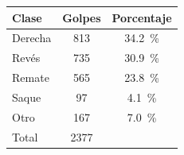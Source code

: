 \begin{tabular}{lcc}
\toprule
\textbf{Clase} & \textbf{Golpes} & \textbf{Porcentaje} \\
\midrule
Derecha & \num{813} & \SI{34.2}{\percent} \\
Revés & \num{735} & \SI{30.9}{\percent} \\
Remate & \num{565} & \SI{23.8}{\percent} \\
Saque & \num{97} & \SI{4.1}{\percent} \\
Otro & \num{167} & \SI{7.0}{\percent} \\
\midrule
Total & \num{2377} &  \\
\bottomrule
\end{tabular}
